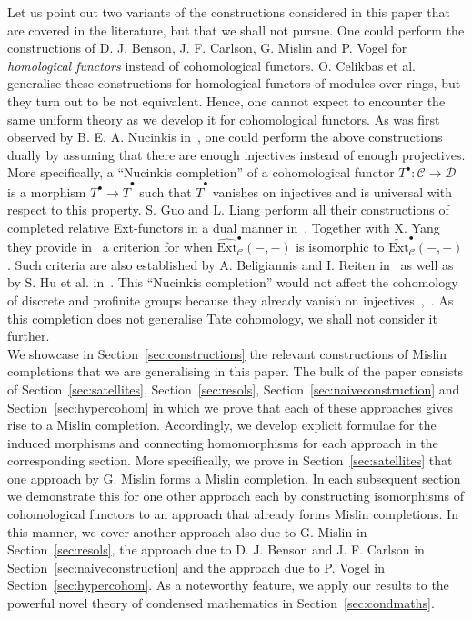 \documentclass[12pt,a4paper]{article}
\numberwithin{equation}{section}
\theoremstyle{nonumberplain}
\begin{document}
Let us point out two variants of the constructions considered in this paper that are covered in the literature, but that we shall not pursue. One could perform the constructions of D.\! J.\! Benson, J.\! F.\! Carlson, G.\! Mislin and P.\! Vogel for \textit{homological functors} instead of cohomological functors. O.\! Celikbas et al.\! generalise these constructions for homological functors of modules over rings, but they turn out to be not equivalent. Hence, one cannot expect to encounter the same uniform theory as we develop it for cohomological functors. As was first observed by B.\! E.\! A.\! Nucinkis in~\cite{nuc98}, one could perform the above constructions dually by assuming that there are enough injectives instead of enough projectives. More specifically, a ``Nucinkis completion'' of a cohomological functor $T^{\bullet}: \mathcal{C} \rightarrow \mathcal{D}$ is a morphism $T^{\bullet} \rightarrow \widetilde{T}^{\bullet}$ such that $\widetilde{T}^{\bullet}$ vanishes on injectives and is universal with respect to this property. S.\! Guo and L.\! Liang perform all their constructions of completed relative Ext-functors in a dual manner in~\cite{guo23}. Together with X.\! Yang they provide in~\cite[Main Theorem]{guol23} a criterion for when $\widehat{\mathrm{Ext}}_{\mathcal{C}}^{\bullet}(-, -)$ is isomorphic to $\widetilde{\mathrm{Ext}}_{\mathcal{C}}^{\bullet}(-, -)$. Such criteria are also established by A.\! Beligiannis and I.\! Reiten in~\cite[Theorem~IX.4.4]{bel07} as well as by S.\! Hu et al.\! in~\cite[Theorem~4.4]{huz21}. This ``Nucinkis completion'' would not affect the cohomology of discrete and profinite groups because they already vanish on injectives~\cite[p.~61]{bro82},~\cite[p.~9]{ser94}. As this completion does not generalise Tate cohomology, we shall not consider it further. \\

We showcase in Section~\ref{sec:constructions} the relevant constructions of Mislin completions that we are generalising in this paper. The bulk of the paper consists of Section~\ref{sec:satellites}, Section~\ref{sec:resols}, Section~\ref{sec:naiveconstruction} and Section~\ref{sec:hypercohom} in which we prove that each of these approaches gives rise to a Mislin completion. Accordingly, we develop explicit formulae for the induced morphisms and connecting homomorphisms for each approach in the corresponding section. More specifically, we prove in Section~\ref{sec:satellites} that one approach by G.\! Mislin forms a Mislin completion. In each subsequent section we demonstrate this for one other approach each by constructing isomorphisms of cohomological functors to an approach that already forms Mislin completions. In this manner, we cover another approach also due to G.\! Mislin in Section~\ref{sec:resols}, the approach due to D.\! J.\! Benson and J.\! F.\! Carlson in Section~\ref{sec:naiveconstruction} and the approach due to P.\! Vogel in Section~\ref{sec:hypercohom}. As a noteworthy feature, we apply our results to the powerful novel theory of condensed mathematics in Section~\ref{sec:condmaths}.
\end{document}
